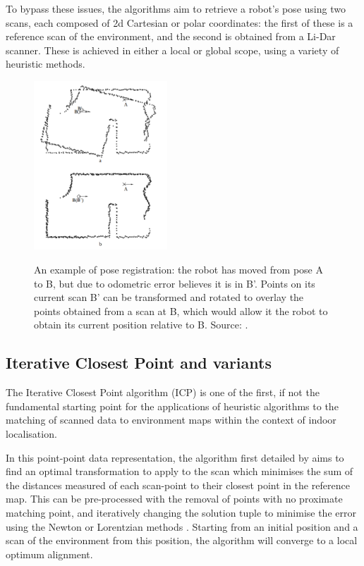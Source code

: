 \documentclass[authoryearcitations]{UoYCSproject}
\begin{document}
To bypass these issues, the algorithms aim to retrieve a robot's pose using two scans, each composed of 2d Cartesian or polar coordinates: the first of these is a reference scan of the environment, and the second is obtained from a Li-Dar scanner. These is achieved in either a local or global scope, using a variety of heuristic methods.

\begin{figure}[ht]
	\centering
	\includegraphics[width=5cm,keepaspectratio]{images/pose_estimation.png}
	\label{fig:pose_estimation}
	\caption[An example of pose registration]{An example of pose registration: the robot has moved from pose A to B, but due to odometric error believes it is in B'. Points on its current scan B' can be transformed and rotated to overlay the points obtained from a scan at B, which would allow it the robot to obtain its current position relative to B. Source: \citet{Lu1997-zv}.}
\end{figure}

\subsection{Iterative Closest Point and variants}
\label{subsec:ICP}
The Iterative Closest Point algorithm (ICP) is one of the first, if not the fundamental starting point for the applications of heuristic algorithms to the matching of scanned data to environment maps within the context of indoor localisation. \newline

In this point-point data representation, the algorithm first detailed by \citet{Besl1992-pd} aims to find an optimal transformation to apply to the scan which minimises the sum of the distances measured of each scan-point to their closest point in the reference map. This can be pre-processed with the removal of points with no proximate matching point, and iteratively changing the solution tuple to minimise the error using the Newton or Lorentzian methods \cite{Munoz2005-gt}. Starting from an initial position and a scan of the environment from this position, the algorithm will converge to a local optimum alignment. \newline
\end{document}
